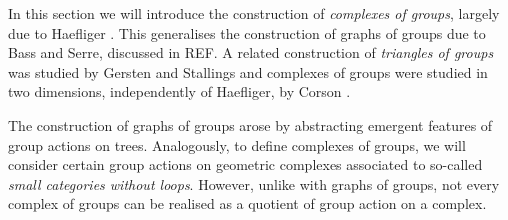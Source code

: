 In this section we will introduce the construction of \emph{complexes of groups}, largely due to Haefliger \cite{haefliger_complexes_1991}.
This generalises the construction of graphs of groups due to Bass and Serre, discussed in REF.
A related construction of \emph{triangles of groups} was studied by Gersten and Stallings \cite{stallings_nonpositively_1991} and complexes of groups were studied in two dimensions, independently of Haefliger, by Corson \cite{corson_complexes_1992}.

The construction of graphs of groups arose by abstracting emergent features of group actions on trees.
Analogously, to define complexes of groups, we will consider certain group actions on geometric complexes associated to so-called \emph{small categories without loops}.
However, unlike with graphs of groups, not every complex of groups can be realised as a quotient of group action on a complex.
